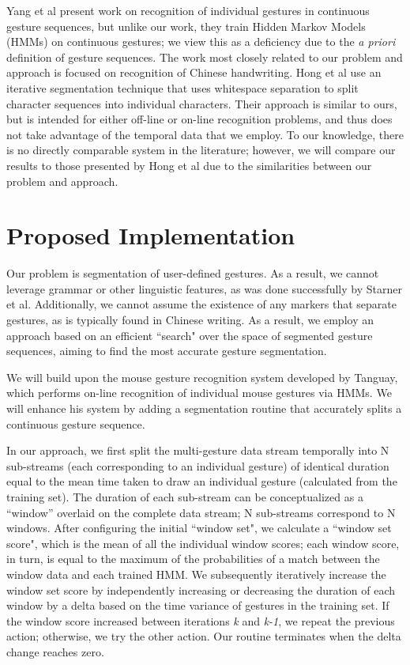 \documentclass[twoside]{article}
\begin{document}
\begin{multicols}{2}
Yang et al \cite{yang_gesture_1994} present work on recognition of individual
gestures in continuous gesture sequences, but unlike our work, they train Hidden Markov Models (HMMs)
on continuous gestures; we view this as a deficiency due to the \emph{a priori}
definition of gesture sequences. The work most closely
related to our problem and approach is focused on recognition of Chinese
handwriting\cite{hong1998segmentation}. Hong et al use an iterative
segmentation technique that uses whitespace separation to split character
sequences into individual characters. Their approach is similar to ours, but is
intended for either off-line or on-line recognition problems, and thus does not
take advantage of the temporal data that we employ. To our knowledge, there is
no directly comparable system in the literature; however, we will compare our
results to those presented by Hong et al\cite{hong1998segmentation} due to the
similarities between our problem and approach.

\section{Proposed Implementation}

Our problem is segmentation of user-defined gestures. As a result, we
cannot leverage grammar or other linguistic features, as was done successfully
by Starner et al\cite{starner1994line}. Additionally, we cannot
assume the existence of any markers that separate gestures, as is typically found in Chinese
writing\cite{hong1998segmentation}. As a result, we employ an approach based on
an efficient ``search" over the space of segmented gesture sequences, aiming to
find the most accurate gesture segmentation.

We will build upon the mouse gesture recognition system developed by
Tanguay\cite{tanguay_jr_hidden_1995}, which performs on-line recognition of
individual mouse gestures via HMMs. We will enhance his system by adding a segmentation
routine that accurately splits a continuous gesture sequence.

In our approach, we first split the multi-gesture data stream temporally into N
sub-streams (each corresponding to an individual gesture) of identical duration
equal to the mean time taken to draw an individual gesture (calculated from the
training set). The duration of each sub-stream can be conceptualized as a
``window'' overlaid on the complete data stream; N sub-streams correspond to N
windows. After configuring the initial ``window set", we calculate a ``window
set score", which is the mean of all the individual window scores; each window
score, in turn, is equal to the maximum of the probabilities of a match between
the window data and each trained HMM. We subsequently iteratively increase the
window set score by independently increasing or decreasing the duration of each
window by a delta based on the time variance of gestures in the training set. If
the window score increased between iterations \emph{k} and \emph{k-1}, we repeat
the previous action; otherwise, we try the other action. Our routine terminates
when the delta change reaches zero.


\end{multicols}
\end{document}
